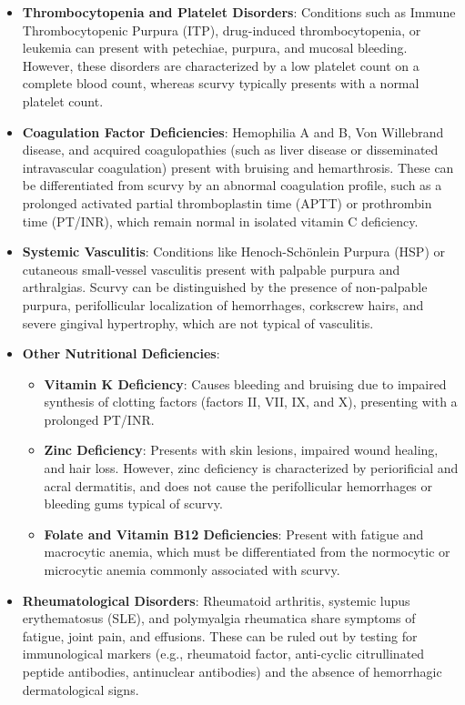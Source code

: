 \begin{itemize}
    \item \textbf{Thrombocytopenia and Platelet Disorders}: Conditions such as Immune Thrombocytopenic Purpura (ITP), drug-induced thrombocytopenia, or leukemia can present with petechiae, purpura, and mucosal bleeding. However, these disorders are characterized by a low platelet count on a complete blood count, whereas scurvy typically presents with a normal platelet count.
    \item \textbf{Coagulation Factor Deficiencies}: Hemophilia A and B, Von Willebrand disease, and acquired coagulopathies (such as liver disease or disseminated intravascular coagulation) present with bruising and hemarthrosis. These can be differentiated from scurvy by an abnormal coagulation profile, such as a prolonged activated partial thromboplastin time (APTT) or prothrombin time (PT/INR), which remain normal in isolated vitamin C deficiency.
    \item \textbf{Systemic Vasculitis}: Conditions like Henoch-Sch\"{o}nlein Purpura (HSP) or cutaneous small-vessel vasculitis present with palpable purpura and arthralgias. Scurvy can be distinguished by the presence of non-palpable purpura, perifollicular localization of hemorrhages, corkscrew hairs, and severe gingival hypertrophy, which are not typical of vasculitis.
    \item \textbf{Other Nutritional Deficiencies}:
        \begin{itemize}
            \item \textbf{Vitamin K Deficiency}: Causes bleeding and bruising due to impaired synthesis of clotting factors (factors II, VII, IX, and X), presenting with a prolonged PT/INR.
            \item \textbf{Zinc Deficiency}: Presents with skin lesions, impaired wound healing, and hair loss. However, zinc deficiency is characterized by periorificial and acral dermatitis, and does not cause the perifollicular hemorrhages or bleeding gums typical of scurvy.
            \item \textbf{Folate and Vitamin B12 Deficiencies}: Present with fatigue and macrocytic anemia, which must be differentiated from the normocytic or microcytic anemia commonly associated with scurvy.
        \end{itemize}
    \item \textbf{Rheumatological Disorders}: Rheumatoid arthritis, systemic lupus erythematosus (SLE), and polymyalgia rheumatica share symptoms of fatigue, joint pain, and effusions. These can be ruled out by testing for immunological markers (e.g., rheumatoid factor, anti-cyclic citrullinated peptide antibodies, antinuclear antibodies) and the absence of hemorrhagic dermatological signs.

\end{itemize}
